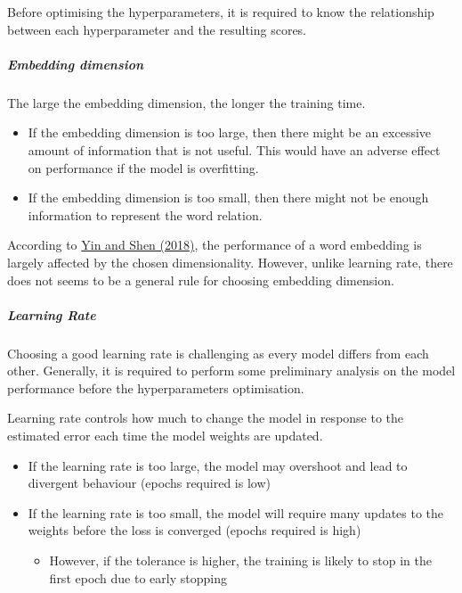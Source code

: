 \documentclass[11pt]{article}
\providecommand{\tightlist}{%
      \setlength{\itemsep}{0pt}\setlength{\parskip}{0pt}}
\begin{document}
Before optimising the hyperparameters, it is required to know the
relationship between each hyperparameter and the resulting scores.

\hypertarget{embedding-dimension}{%
\subparagraph{Embedding dimension}\label{embedding-dimension}}

The large the embedding dimension, the longer the training time.

\begin{itemize}
\item
  If the embedding dimension is too large, then there might be an
  excessive amount of information that is not useful. This would have an
  adverse effect on performance if the model is overfitting.
\item
  If the embedding dimension is too small, then there might not be
  enough information to represent the word relation.
\end{itemize}

According to
\href{http://papers.nips.cc/paper/7368-on-the-dimensionality-of-word-embedd}{Yin
and Shen (2018)}, the performance of a word embedding is largely
affected by the chosen dimensionality. However, unlike learning rate,
there does not seems to be a general rule for choosing embedding
dimension.

\hypertarget{learning-rate}{%
\subparagraph{Learning Rate}\label{learning-rate}}

Choosing a good learning rate is challenging as every model differs from
each other. Generally, it is required to perform some preliminary
analysis on the model performance before the hyperparameters
optimisation.

Learning rate controls how much to change the model in response to the
estimated error each time the model weights are updated.

\begin{itemize}
\item
  If the learning rate is too large, the model may overshoot and lead to
  divergent behaviour (epochs required is low)
\item
  If the learning rate is too small, the model will require many updates
  to the weights before the loss is converged (epochs required is high)

  \begin{itemize}
  \tightlist
  \item
    However, if the tolerance is higher, the training is likely to stop
    in the first epoch due to early stopping
  \end{itemize}
\end{itemize}
\end{document}
